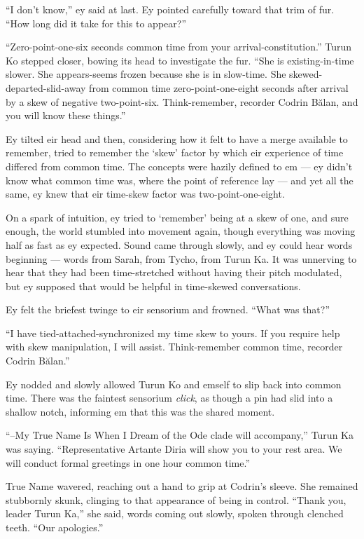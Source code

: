 ``I don't know,'' ey said at last. Ey pointed carefully toward that trim of fur. ``How long did it take for this to appear?''

``Zero-point-one-six seconds common time from your arrival-constitution.'' Turun Ko stepped closer, bowing its head to investigate the fur. ``She is existing-in-time slower. She appears-seems frozen because she is in slow-time. She skewed-departed-slid-away from common time zero-point-one-eight seconds after arrival by a skew of negative two-point-six. Think-remember, recorder Codrin Bălan, and you will know these things.''

Ey tilted eir head and then, considering how it felt to have a merge available to remember, tried to remember the `skew' factor by which eir experience of time differed from common time. The concepts were hazily defined to em — ey didn't know what common time was, where the point of reference lay — and yet all the same, ey knew that eir time-skew factor was two-point-one-eight.

On a spark of intuition, ey tried to `remember' being at a skew of one, and sure enough, the world stumbled into movement again, though everything was moving half as fast as ey expected. Sound came through slowly, and ey could hear words beginning — words from Sarah, from Tycho, from Turun Ka. It was unnerving to hear that they had been time-stretched without having their pitch modulated, but ey supposed that would be helpful in time-skewed conversations.

Ey felt the briefest twinge to eir sensorium and frowned. ``What was that?''

``I have tied-attached-synchronized my time skew to yours. If you require help with skew manipulation, I will assist. Think-remember common time, recorder Codrin Bălan.''

Ey nodded and slowly allowed Turun Ko and emself to slip back into common time. There was the faintest sensorium \emph{click}, as though a pin had slid into a shallow notch, informing em that this was the shared moment.

``--My True Name Is When I Dream of the Ode clade will accompany,'' Turun Ka was saying. ``Representative Artante Diria will show you to your rest area. We will conduct formal greetings in one hour common time.''

True Name wavered, reaching out a hand to grip at Codrin's sleeve. She remained stubbornly skunk, clinging to that appearance of being in control. ``Thank you, leader Turun Ka,'' she said, words coming out slowly, spoken through clenched teeth. ``Our apologies.''

